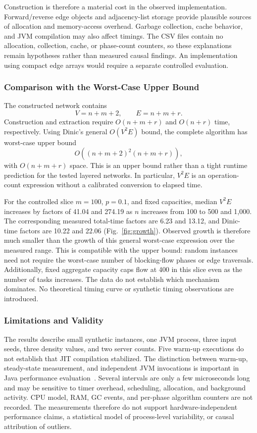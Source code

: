 \documentclass[conference]{IEEEtran}
\theoremstyle{definition}
\theoremstyle{remark}
\begin{document}
Construction is therefore a material cost in the observed implementation.
Forward/reverse edge objects and adjacency-list storage provide plausible
sources of allocation and memory-access overhead. Garbage collection, cache
behavior, and JVM compilation may also affect timings. The CSV files contain
no allocation, collection, cache, or phase-count counters, so these explanations
remain hypotheses rather than measured causal findings. An implementation
using compact edge arrays would require a separate controlled evaluation.

\subsubsection{Comparison with the Worst-Case Upper Bound}
The constructed network contains
\begin{equation}
V=n+m+2,\qquad E=n+m+r.
\end{equation}
Construction and extraction require $O(n+m+r)$ and $O(n+r)$ time,
respectively. Using Dinic's general $O(V^2E)$ bound, the complete algorithm
has worst-case upper bound
\begin{equation}
O\!\left((n+m+2)^2(n+m+r)\right),
\end{equation}
with $O(n+m+r)$ space. This is an upper bound rather than a tight runtime
prediction for the tested layered networks. In particular, $V^2E$ is an
operation-count expression without a calibrated conversion to elapsed time.

For the controlled slice $m=100$, $p=0.1$, and fixed capacities, median
$V^2E$ increases by factors of 41.04 and 274.19 as $n$ increases from
100 to 500 and 1,000. The corresponding measured total-time factors are
6.23 and 13.12, and Dinic-time factors are 10.22 and 22.06
(Fig.~\ref{fig:growth}). Observed growth is therefore much smaller than the
growth of this general worst-case expression over the measured range.
This is compatible with the upper bound: random instances need not require
the worst-case number of blocking-flow phases or edge traversals. Additionally,
fixed aggregate capacity caps flow at 400 in this slice even as the number
of tasks increases. The data do not establish which mechanism dominates.
No theoretical timing curve or synthetic timing observations are introduced.

\subsubsection{Limitations and Validity}
The results describe small synthetic instances, one JVM process, three input
seeds, three density values, and two server counts. Five warm-up executions
do not establish that JIT compilation stabilized. The distinction between
warm-up, steady-state measurement, and independent JVM invocations is
important in Java performance evaluation~\cite{georges2007}. Several intervals are only
a few microseconds long and may be sensitive to timer overhead, scheduling,
allocation, and background activity. CPU model, RAM, GC events, and per-phase
algorithm counters are not recorded. The measurements therefore do not
support hardware-independent performance claims, a statistical model of
process-level variability, or causal attribution of outliers.
\end{document}
